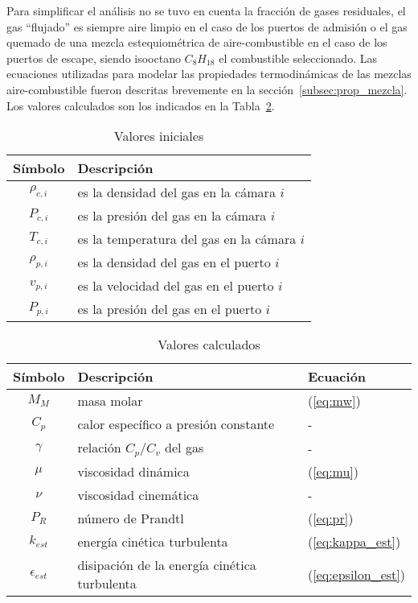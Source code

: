 Para simplificar el análisis no se tuvo en cuenta la fracción de gases
residuales, el gas ``flujado'' es siempre aire limpio en el caso de los puertos
de admisión o el gas quemado de una mezcla estequiométrica de aire-combustible
en el caso de los puertos de escape, siendo isooctano $C_{8}H_{18}$ el
combustible seleccionado.
%
Las ecuaciones utilizadas para modelar las propiedades termodinámicas de las
mezclas aire-combustible fueron descritas brevemente en la
sección~\ref{subsec:prop_mezcla}.
%
Los valores calculados son los indicados en la
Tabla~\ref{tab:valores_calculados}.

\begin{table}[h!]  \centering
  \begin{tabular}{cl}\toprule
    Símbolo & Descripción \\ \midrule
    $\rho_{c,i}$ & es la densidad del gas en la cámara $i$ \\
    $P_{c,i}$ & es la presión del gas en la cámara $i$ \\
    $T_{c,i}$ & es la temperatura del gas en la cámara $i$ \\
    $\rho_{p,i}$ & es la densidad del gas en el puerto $i$ \\
    $v_{p,i}$ & es la velocidad del gas en el puerto $i$ \\
    $P_{p,i}$ & es la presión del gas en el puerto $i$ \\ \bottomrule
  \end{tabular}
\caption{Valores iniciales}\label{tab:valores_iniciales}
\end{table}

\begin{table}[h!]  \centering
  \begin{tabular}{cll}\toprule
    Símbolo & Descripción & Ecuación\\ \midrule
    $M_{M}$ & masa molar & (\ref{eq:mw}) \\
    $C_{p}$ & calor específico a presión constante & - \\
    $\gamma$ & relación $C_{p}/C_{v}$ del gas & - \\
    $\mu$ & viscosidad dinámica & (\ref{eq:mu}) \\
    $\nu$ & viscosidad cinemática & - \\
    $P_{R}$ & número de Prandtl & (\ref{eq:pr}) \\
    $k_{est}$ & energía cinética turbulenta & (\ref{eq:kappa_est}) \\
    $\epsilon_{est}$ & disipación de la energía cinética turbulenta & (\ref{eq:epsilon_est}) \\ \bottomrule
  \end{tabular}
  \caption{Valores calculados}\label{tab:valores_calculados}
\end{table}

